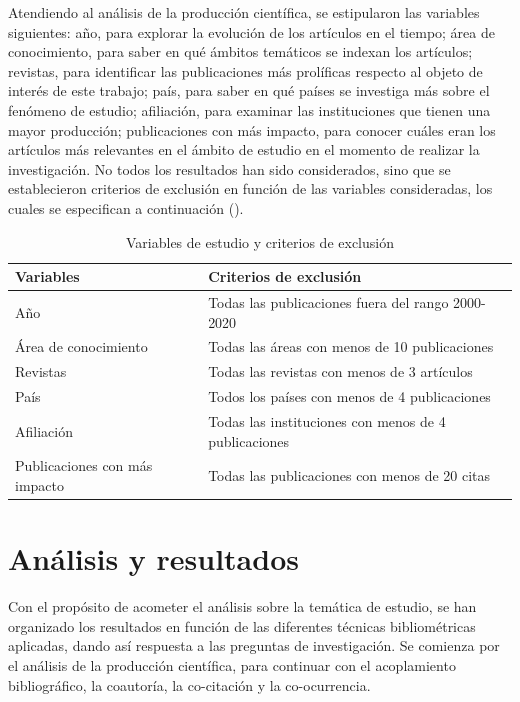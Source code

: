 \documentclass[spanish]{textolivre}
\begin{document}
Atendiendo al análisis de la producción científica, se estipularon las variables siguientes: año, para explorar la evolución de los artículos en el tiempo; área de conocimiento, para saber en qué ámbitos temáticos se indexan los artículos; revistas, para identificar las publicaciones más prolíficas respecto al objeto de interés de este trabajo; país, para saber en qué países se investiga más sobre el fenómeno de estudio; afiliación, para examinar las instituciones que tienen una mayor producción; publicaciones con más impacto, para conocer cuáles eran los artículos más relevantes en el ámbito de estudio en el momento de realizar la investigación. No todos los resultados han sido considerados, sino que se establecieron criterios de exclusión en función de las variables consideradas, los cuales se especifican a continuación ().

\begin{table}[h!]
\centering
\begin{threeparttable}
\caption{Variables de estudio y criterios de exclusión}
\label{tab1}
\begin{tabular}{ll}
\toprule
Variables                     & Criterios de exclusión                               \\
\midrule
Año                           & Todas las publicaciones fuera del rango 2000-2020    \\
Área de conocimiento          & Todas las áreas con menos de 10 publicaciones        \\
Revistas                      & Todas las revistas con menos de 3 artículos          \\
País                          & Todos los países con menos de 4 publicaciones        \\
Afiliación                    & Todas las instituciones con menos de 4 publicaciones \\
Publicaciones con más impacto & Todas las publicaciones con menos de 20 citas    \\
\bottomrule
\end{tabular}
\end{threeparttable}
\end{table}

\section{Análisis y resultados}

Con el propósito de acometer el análisis sobre la temática de estudio, se han organizado los resultados en función de las diferentes técnicas bibliométricas aplicadas, dando así respuesta a las preguntas de investigación. Se comienza por el análisis de la producción científica, para continuar con el acoplamiento bibliográfico, la coautoría, la co-citación y la co-ocurrencia.
\end{document}
